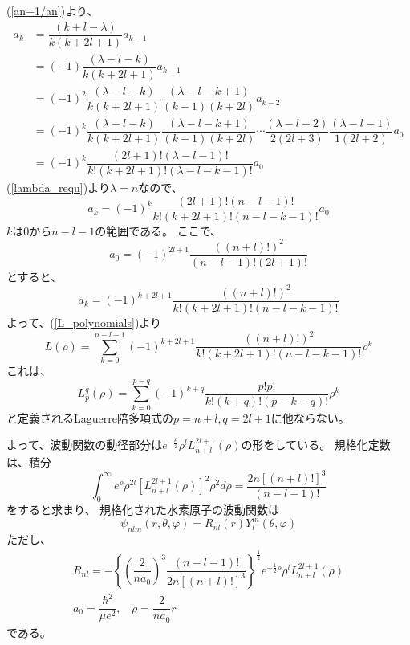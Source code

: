 \documentclass[a4paper,16pt]{jsarticle}
\begin{document}
(\ref{an+1/an})より、
\begin{align}
	a_k &= \dfrac{(k+l-\lambda)}{k(k+2l+1)}a_{k-1} \\
			&= (-1)\dfrac{(\lambda-l-k)}{k(k+2l+1)}a_{k-1} \\
			&= (-1)^2\dfrac{(\lambda-l-k)}{k(k+2l+1)}\dfrac{(\lambda-l-k+1)}{(k-1)(k+2l)}a_{k-2} \\
			&= (-1)^k\dfrac{(\lambda-l-k)}{k(k+2l+1)}\dfrac{(\lambda-l-k+1)}{(k-1)(k+2l)}
			\cdots\dfrac{(\lambda-l-2)}{2(2l+3)}\dfrac{(\lambda-l-1)}{1(2l+2)}a_0 \\
			&= (-1)^k\dfrac{(2l+1)!(\lambda-l-1)!}{k!(k+2l+1)!(\lambda-l-k-1)!}a_0
\end{align}
(\ref{lambda_requ})より$\lambda = n$なので、
\begin{equation}
	a_k = (-1)^k\dfrac{(2l+1)!(n-l-1)!}{k!(k+2l+1)!(n-l-k-1)!}a_0
\end{equation}
$k$は$0$から$n-l-1$の範囲である。
ここで、
\begin{equation}
	a_0 = (-1)^{2l+1}\dfrac{((n+l)!)^2}{(n−l−1)!(2l+1)!}
\end{equation}
とすると、
\begin{equation}
	a_k = (-1)^{k+2l+1}\dfrac{((n+l)!)^2}{k!(k+2l+1)!(n-l-k-1)!}
\end{equation}
よって、(\ref{L_polynomials})より
\begin{equation}
	L(\rho) = \sum_{k=0}^{n-l-1}(-1)^{k+2l+1}\dfrac{((n+l)!)^2}{k!(k+2l+1)!(n-l-k-1)!}\rho^k
\end{equation}
これは、
\begin{equation}
	L_p^q(\rho) = \sum_{k = 0}^{p-q} (-1)^{k+q} \dfrac{p!p!}{k!(k+q)!(p-k-q)!}\rho^k
\end{equation}
と定義されるLaguerre陪多項式の$p = n+l,q = 2l+1$に他ならない。

よって、波動関数の動径部分は$e^{-\frac{\rho}{2}}\rho^l L_{n+l}^{2l+1}(\rho)$の形をしている。
規格化定数は、積分
\begin{equation}
	\int_0^\infty e^\rho \rho^{2l} [L_{n+l}^{2l+1}(\rho)]^2 \rho^2 d\rho
	= \dfrac{2n[(n+l)!]^3}{(n-l-1)!}
\end{equation}
をすると求まり、
規格化された水素原子の波動関数は
\begin{equation}
	\psi_{nlm}(r,\theta,\varphi) = R_{nl}(r)Y_l^m(\theta,\varphi)
\end{equation}
ただし、
\begin{align}
	R_{nl} = - \left\{ \left(\dfrac{2}{na_0}\right)^3\dfrac{(n-l-1)!}{2n[(n+l)!]^3}\right\}^{\frac{1}{2}}e^{-\frac{1}{2}\rho}\rho^l L_{n+l}^{2l+1}(\rho) \\
	a_0 = \dfrac{\hbar^2}{\mu e^2},~~~~\rho = \dfrac{2}{n a_0}r
\end{align}
である。
\end{document}
